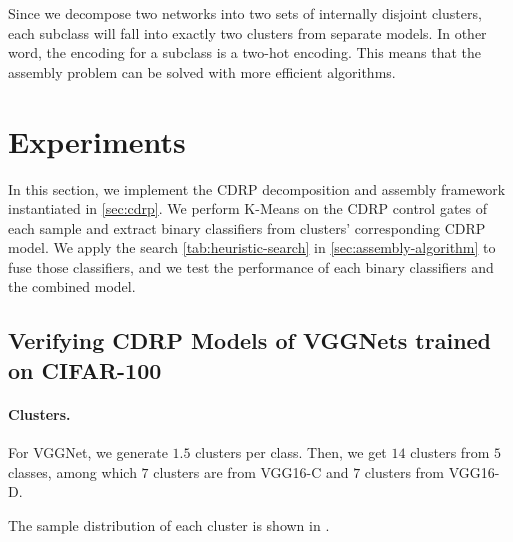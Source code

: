 \documentclass[sigplan,10pt,review]{acmart}\settopmatter{printfolios=true,printccs=false,printacmref=false}
\begin{document}
Since we decompose two networks into two sets of internally disjoint clusters, each subclass will fall into exactly two clusters from separate models.
In other word, the encoding for a subclass is a two-hot encoding.
This means that the assembly problem can be solved with more efficient algorithms.

\section{Experiments}
In this section, we implement the CDRP decomposition and assembly framework instantiated in \cref{sec:cdrp}.
We perform K-Means on the CDRP control gates of each sample and extract binary classifiers from clusters' corresponding CDRP model.
We apply the search \cref{tab:heuristic-search} in \cref{sec:assembly-algorithm} to fuse those classifiers, and we test the performance of each binary classifiers and the combined model.

\label{sec:experiments}
\subsection{Verifying CDRP Models of VGGNets trained on CIFAR-100}
\paragraph{Clusters.} For VGGNet, we generate $1.5$ clusters per class.
Then, we get $14$ clusters from $5$ classes, among which $7$ clusters are from VGG16-C and $7$ clusters from VGG16-D. 

The sample distribution of each cluster is shown in .
\end{document}
